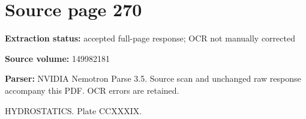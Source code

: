 \clearpage
\section{Source page 270}
\textbf{Extraction status:} accepted full-page response; OCR not manually corrected\par
\textbf{Source volume:} 149982181\par
\textbf{Parser:} NVIDIA Nemotron Parse 3.5. Source scan and unchanged raw response accompany this PDF. OCR errors are retained.\par\medskip
HYDROSTATICS. Plate CCXXXIX.\par\medskip
